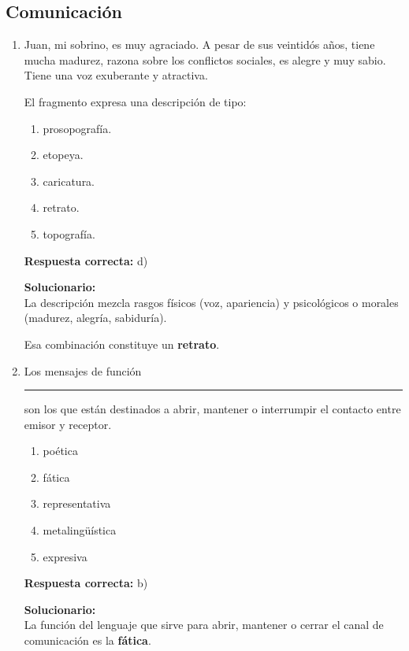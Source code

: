 \subsection*{Comunicación}

\begin{enumerate}

	
	\item Juan, mi sobrino, es muy agraciado. A pesar de sus veintidós años, tiene mucha madurez, razona sobre los conflictos sociales, es alegre y muy sabio. Tiene una voz exuberante y atractiva.
	
	El fragmento expresa una descripción de tipo:
	\begin{enumerate}[label=\alph*)]
		\item prosopografía.
		\item etopeya.
		\item caricatura.
		\item retrato.
		\item topografía.
	\end{enumerate}
	\textbf{Respuesta correcta:} d)
	
	\vspace{2mm}
	\textbf{Solucionario:}\\
	La descripción mezcla rasgos físicos (voz, apariencia) y psicológicos o morales (madurez, alegría, sabiduría).
	
	Esa combinación constituye un \textbf{retrato}.
	

	
	\vspace{6mm}
	
	\item Los mensajes de función \rule{2cm}{0.15mm} son los que están destinados a abrir, mantener o interrumpir el contacto entre emisor y receptor.
	\begin{enumerate}[label=\alph*)]
		\item poética
		\item fática
		\item representativa
		\item metalingüística
		\item expresiva
	\end{enumerate}
	\textbf{Respuesta correcta:} b)
	
	\vspace{2mm}
	\textbf{Solucionario:}\\
	La función del lenguaje que sirve para abrir, mantener o cerrar el canal de comunicación es la \textbf{fática}.
	


\end{enumerate}
